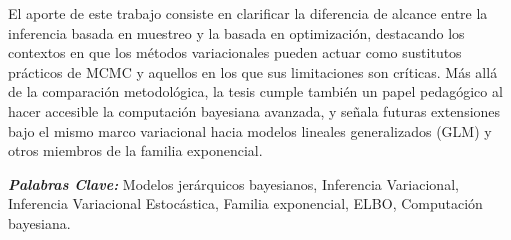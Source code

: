 El aporte de este trabajo consiste en clarificar la diferencia de alcance entre la inferencia basada en muestreo y la basada en optimización, destacando los contextos en que los métodos variacionales pueden actuar como sustitutos prácticos de MCMC y aquellos en los que sus limitaciones son críticas. Más allá de la comparación metodológica, la tesis cumple también un papel pedagógico al hacer accesible la computación bayesiana avanzada, y señala futuras extensiones bajo el mismo marco variacional hacia modelos lineales generalizados (GLM) y otros miembros de la familia exponencial.

\vspace{0.5 cm}

\textbf{\small \textit{Palabras Clave:}} Modelos jerárquicos bayesianos, Inferencia Variacional, Inferencia Variacional Estocástica, Familia exponencial, ELBO, Computación bayesiana.
